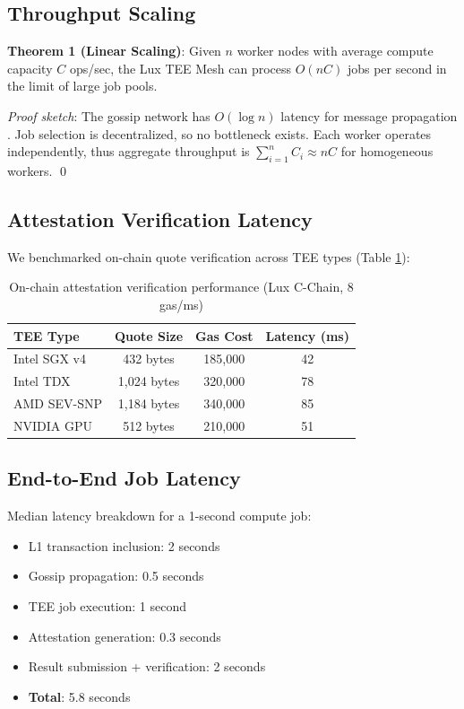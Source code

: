 \documentclass[11pt,letterpaper]{article}
\begin{document}
\subsection{Throughput Scaling}

\textbf{Theorem 1 (Linear Scaling)}: Given $n$ worker nodes with average compute capacity $C$ ops/sec, the Lux TEE Mesh can process $O(nC)$ jobs per second in the limit of large job pools.

\textit{Proof sketch}: The gossip network has $O(\log n)$ latency for message propagation \cite{gossipsub-analysis}. Job selection is decentralized, so no bottleneck exists. Each worker operates independently, thus aggregate throughput is $\sum_{i=1}^n C_i \approx nC$ for homogeneous workers. \qed

\subsection{Attestation Verification Latency}

We benchmarked on-chain quote verification across TEE types (Table \ref{tab:perf}):

\begin{table}[h]
\centering
\begin{tabular}{@{}lccc@{}}
\toprule
\textbf{TEE Type} & \textbf{Quote Size} & \textbf{Gas Cost} & \textbf{Latency (ms)} \\
\midrule
Intel SGX v4 & 432 bytes & 185,000 & 42 \\
Intel TDX & 1,024 bytes & 320,000 & 78 \\
AMD SEV-SNP & 1,184 bytes & 340,000 & 85 \\
NVIDIA GPU & 512 bytes & 210,000 & 51 \\
\bottomrule
\end{tabular}
\caption{On-chain attestation verification performance (Lux C-Chain, 8 gas/ms)}
\label{tab:perf}
\end{table}

\subsection{End-to-End Job Latency}

Median latency breakdown for a 1-second compute job:

\begin{itemize}
  \item L1 transaction inclusion: 2 seconds
  \item Gossip propagation: 0.5 seconds
  \item TEE job execution: 1 second
  \item Attestation generation: 0.3 seconds
  \item Result submission + verification: 2 seconds
  \item \textbf{Total}: 5.8 seconds
\end{itemize}
\end{document}
